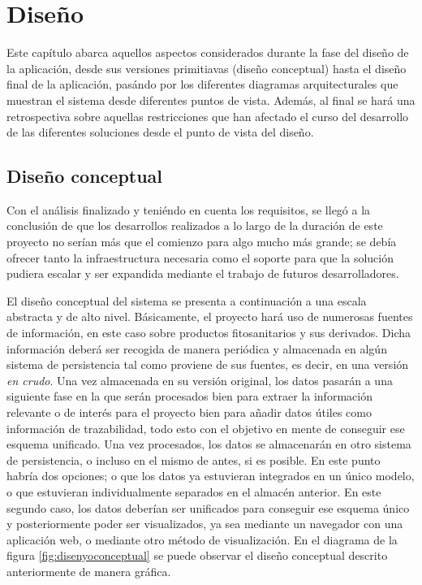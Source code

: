 \chapter{Diseño}  \label{disenyo}

Este capítulo abarca aquellos aspectos considerados durante la fase del diseño de la aplicación, desde sus versiones primitiavas (diseño conceptual) hasta el diseño final de la aplicación, pasándo por los diferentes diagramas arquitecturales que muestran el sistema desde diferentes puntos de vista. Además, al final se hará una retrospectiva sobre aquellas restricciones que han afectado el curso del desarrollo de las diferentes soluciones desde el punto de vista del diseño. 


\section{Diseño conceptual} \label{disenyo.conceptual}
Con el análisis finalizado y teniéndo en cuenta los requisitos, se llegó a la conclusión de que los desarrollos realizados a lo largo de la duración de este proyecto no serían más que el comienzo para algo mucho más grande; se debía ofrecer tanto la infraestructura necesaria como el soporte para que la solución pudiera escalar y ser expandida mediante el trabajo de futuros desarrolladores. 


\par 
El diseño conceptual del sistema se presenta a continuación a una escala abstracta y de alto nivel. Básicamente, el proyecto hará uso de numerosas fuentes de información, en este caso sobre productos fitosanitarios y sus derivados. Dicha información deberá ser recogida de manera periódica y almacenada en algún sistema de persistencia tal como proviene de sus fuentes, es decir, en una versión \textit{en crudo}. Una vez almacenada en su versión original, los datos pasarán a una siguiente fase en la que serán procesados bien para extraer la información relevante o de interés para el proyecto bien para añadir datos útiles como información de trazabilidad, todo esto con el objetivo en mente de conseguir ese esquema unificado. Una vez procesados, los datos se almacenarán en otro sistema de persistencia, o incluso en el mismo de antes, si es posible. En este punto habría dos opciones; o que los datos ya estuvieran integrados en un único modelo, o que estuvieran individualmente separados en el almacén anterior. En este segundo caso, los datos deberían ser unificados para conseguir ese esquema único y posteriormente poder ser visualizados, ya sea mediante un navegador con una aplicación web, o mediante otro método de visualización. En el diagrama de la figura \ref{fig:disenyoconceptual} se puede observar el diseño conceptual descrito anteriormente de manera gráfica. 

